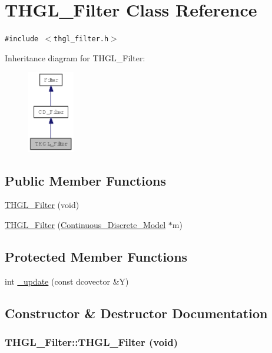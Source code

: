 \hypertarget{class_t_h_g_l___filter}{
\section{THGL\_\-Filter Class Reference}
\label{class_t_h_g_l___filter}
}
{\tt \#include $<$thgl\_\-filter.h$>$}

Inheritance diagram for THGL\_\-Filter:\nopagebreak
\begin{figure}[H]
\begin{center}
\leavevmode
\includegraphics[width=58pt]{class_t_h_g_l___filter__inherit__graph}
\end{center}
\end{figure}
\subsection*{Public Member Functions}
\begin{CompactItemize}
\item 
\hyperlink{class_t_h_g_l___filter_4bd120e267d0de8863eebc154dd3730d}{THGL\_\-Filter} (void)
\item 
\hyperlink{class_t_h_g_l___filter_cd237359274fb7e0e7a7f00570acd76a}{THGL\_\-Filter} (\hyperlink{class_continuous___discrete___model}{Continuous\_\-Discrete\_\-Model} $\ast$m)
\end{CompactItemize}
\subsection*{Protected Member Functions}
\begin{CompactItemize}
\item 
int \hyperlink{class_t_h_g_l___filter_2139ff41dc0eaa613847429c266ba7a5}{\_\-update} (const dcovector \&Y)
\end{CompactItemize}


\subsection{Constructor \& Destructor Documentation}
\hypertarget{class_t_h_g_l___filter_4bd120e267d0de8863eebc154dd3730d}{
\subsubsection[{THGL\_\-Filter}]{\setlength{\rightskip}{0pt plus 5cm}THGL\_\-Filter::THGL\_\-Filter (void)}}
\label{class_t_h_g_l___filter_4bd120e267d0de8863eebc154dd3730d}


